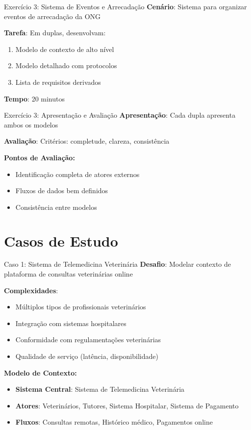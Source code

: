 \documentclass[aspectratio=169]{beamer}
\begin{document}
\begin{frame}{Exercício 3: Sistema de Eventos e Arrecadação}
\textbf{Cenário}: Sistema para organizar eventos de arrecadação da ONG

\textbf{Tarefa}: Em duplas, desenvolvam:
\begin{enumerate}
\item Modelo de contexto de alto nível
\item Modelo detalhado com protocolos
\item Lista de requisitos derivados
\end{enumerate}

\vspace{0.5cm}
\textbf{Tempo}: 20 minutos
\end{frame}

\begin{frame}{Exercício 3: Apresentação e Avaliação}
\textbf{Apresentação}: Cada dupla apresenta ambos os modelos

\vspace{0.5cm}
\textbf{Avaliação}: Critérios: completude, clareza, consistência

\vspace{0.5cm}
\textbf{Pontos de Avaliação:}
\begin{itemize}
\item Identificação completa de atores externos
\item Fluxos de dados bem definidos
\item Consistência entre modelos
\end{itemize}
\end{frame}

\section{Casos de Estudo}

\begin{frame}{Caso 1: Sistema de Telemedicina Veterinária}
\textbf{Desafio}: Modelar contexto de plataforma de consultas veterinárias online

\textbf{Complexidades}:
\begin{itemize}
\item Múltiplos tipos de profissionais veterinários
\item Integração com sistemas hospitalares
\item Conformidade com regulamentações veterinárias
\item Qualidade de serviço (latência, disponibilidade)
\end{itemize}

\vspace{0.5cm}
\textbf{Modelo de Contexto:}
\begin{itemize}
\item \textbf{Sistema Central}: Sistema de Telemedicina Veterinária
\item \textbf{Atores}: Veterinários, Tutores, Sistema Hospitalar, Sistema de Pagamento
\item \textbf{Fluxos}: Consultas remotas, Histórico médico, Pagamentos online
\end{itemize}
\end{frame}
\end{document}

